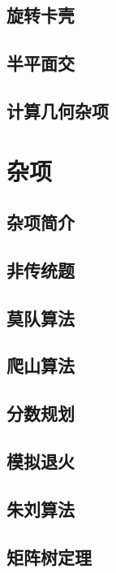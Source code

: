 \section{旋转卡壳}

\section{半平面交}

\section{计算几何杂项}

\chapter{杂项}
\section{杂项简介}

\section{非传统题}


\section{莫队算法}

\section{爬山算法}

\section{分数规划}

\section{模拟退火}

\section{朱刘算法}

\section{矩阵树定理}

